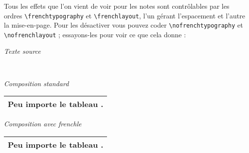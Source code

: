 \documentclass[a4paper,12pt,openright]{article}
\begin{document}
\frenchtypography\frenchlayout
Tous les effets que l’on vient de voir pour les notes sont contrôlables par
les ordres \texttt{{\backslash}french\-typography}
 et \verb|\frenchlayout|, l’un gérant l’espacement et
l’autre la mise-en-page. Pour les désactiver vous pouvez coder 
\texttt{{\backslash}nofrenchtypography}
et \texttt{{\backslash}nofrenchlayout} ; 
essayons-les pour voir ce que cela donne :

\begin{center} %
\textit{Texte source}\\
\\[.5em]
\setcounter{mpfootnote}{1} %
\renewcommand{\thempfootnote}{\arabic{mpfootnote}}
\parbox[t]{70mm}{
\begin{center}
\textit{Composition standard}
{\nofrenchtypography\nofrenchlayout
\begin{minipage}{65mm}
\begin{tabular}{|c|}
\hline
\rule{0pt}{1.6em}\Large Peu importe le tableau
\footnotemark[1].\\
\hline
\end{tabular}
\end{minipage}
}
\end{center}
}%
\parbox[t]{70mm}{
\begin{center}
\textit{Composition avec frenchle}

\begin{minipage}{65mm}
\begin{tabular}{|c|}
\hline
\rule{0pt}{1.6em}\Large Peu importe le tableau
\footnotemark[1].\\
\hline
\end{tabular}
\end{minipage}

\end{center}
}
%
\end{center}
\end{document}
